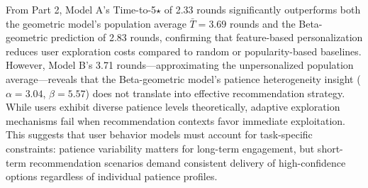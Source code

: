 \documentclass[12pt,a4paper]{article}
\begin{document}
From Part 2, Model A's Time-to-5$\star$ of 2.33 rounds significantly outperforms both the geometric model's population average $\bar{T} = 3.69$ rounds and the Beta-geometric prediction of 2.83 rounds, confirming that feature-based personalization reduces user exploration costs compared to random or popularity-based baselines. However, Model B's 3.71 rounds—approximating the unpersonalized population average—reveals that the Beta-geometric model's patience heterogeneity insight ($\alpha = 3.04$, $\beta = 5.57$) does not translate into effective recommendation strategy. While users exhibit diverse patience levels theoretically, adaptive exploration mechanisms fail when recommendation contexts favor immediate exploitation. This suggests that user behavior models must account for task-specific constraints: patience variability matters for long-term engagement, but short-term recommendation scenarios demand consistent delivery of high-confidence options regardless of individual patience profiles.
\end{document}
